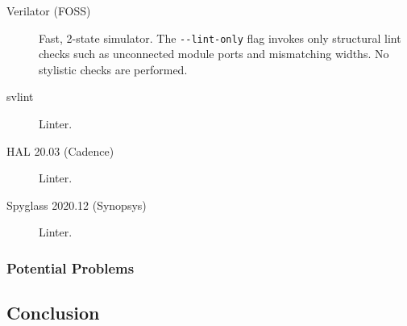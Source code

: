 \documentclass[a4paper]{article}
\begin{document}
\begin{description}
\item[Verilator (\gls{FOSS})]
  Fast, 2-state simulator.
  The \texttt{{-}{-}lint-only} flag invokes only structural lint checks such as
  unconnected module ports and mismatching widths.
  No stylistic checks are performed.
\item[svlint]
  Linter.
\item[HAL 20.03 (Cadence)]
  Linter.
\item[Spyglass 2020.12 (Synopsys)]
  Linter.
\end{description}


\subsubsection{Potential Problems} %
\label{sec:HungarianNotation_potentialProblems}



\subsection{Conclusion} %
\label{sec:HungarianNotation_conclusion}

\end{document}
